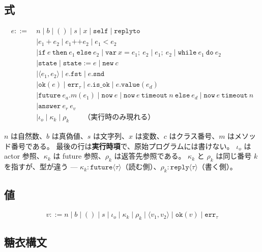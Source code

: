 \documentclass[11pt,a4paper]{ltjsarticle}
\theoremstyle{definition}
\theoremstyle{remark}
\newcommand{\tfut}[1]{\ensuremath{\mathtt{future}\langle #1 \rangle}}
\newcommand{\trep}[1]{\ensuremath{\mathtt{reply}\langle #1 \rangle}}
\begin{document}
\subsection{式}

\begin{align*}
e ::=\ & n \mid b \mid () \mid s \mid x \mid \mathtt{self}
     \mid \mathtt{replyto} \\
  & \mid e_1 + e_2 \mid e_1 \mathbin{\texttt{++}} e_2 \mid e_1 < e_2 \\
  & \mid \mathtt{if}\ e\ \mathtt{then}\ e_1\ \mathtt{else}\ e_2
     \mid \mathtt{var}\ x = e_1;\ e_2 \mid e_1;\ e_2
     \mid \mathtt{while}\ e_1\ \mathtt{do}\ e_2 \\
  & \mid \mathtt{state} \mid \mathtt{state} := e \mid \mathtt{new}\ c \\
  & \mid \langle e_1, e_2\rangle \mid e.\mathtt{fst} \mid e.\mathtt{snd} \\
  & \mid \mathtt{ok}(e) \mid \mathtt{err}_\tau \mid e.\mathtt{is\_ok}
     \mid e.\mathtt{value}(e_d) \\
  & \mid \mathtt{future}\ e_a.m(e_1)
     \mid \mathtt{now}\ e
     \mid \mathtt{now}\ e\ \mathtt{timeout}\ n\ \mathtt{else}\ e_d
     \mid \mathtt{now}\ e\ \mathtt{timeout}\ n \\
  & \mid \mathtt{answer}\ e_r\ e_v \\[2pt]
  & \mid \iota_o \mid \kappa_k \mid \rho_k \qquad\text{（実行時のみ現れる）}
\end{align*}

$n$ は自然数、$b$ は真偽値、$s$ は文字列、$x$ は変数、$c$ はクラス番号、$m$ はメソッド番号である。
最後の行は\textbf{実行時項}で、原始プログラムには書けない。
$\iota_o$ は actor 参照、$\kappa_k$ は future 参照、$\rho_k$ は返答先参照である。
$\kappa_k$ と $\rho_k$ は同じ番号 $k$ を指すが、型が違う ---
$\kappa_k : \tfut{\tau}$（読む側）、$\rho_k : \trep{\tau}$（書く側）。

\subsection{値}

\[
v ::= n \mid b \mid () \mid s \mid \iota_o \mid \kappa_k \mid \rho_k
   \mid \langle v_1, v_2 \rangle \mid \mathtt{ok}(v) \mid \mathtt{err}_\tau
\]

\subsection{糖衣構文}
\end{document}
